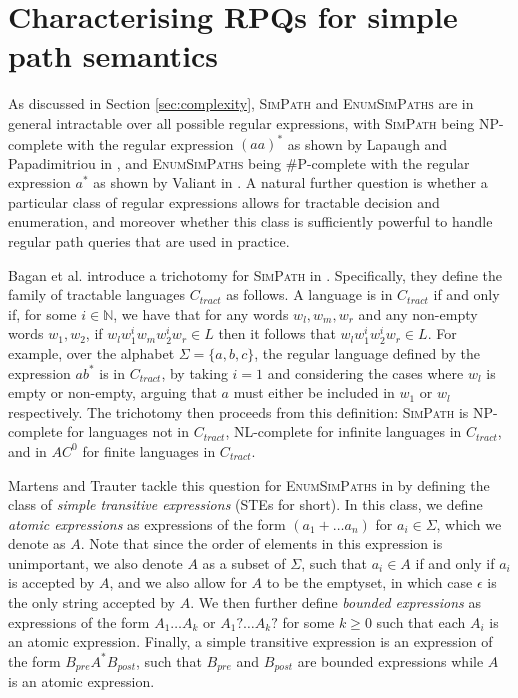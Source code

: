 \documentclass{article}
\begin{document}
\section{Characterising RPQs for simple path semantics}
\label{sec:simple_characterisation}

As discussed in Section \ref{sec:complexity}, \textsc{SimPath} and \textsc{EnumSimPaths} are in general intractable over all possible regular expressions, with \textsc{SimPath} being NP-complete with the regular expression $(aa)^*$ as shown by Lapaugh and Papadimitriou in \cite{lapaughEvenpathProblemGraphs1984}, and \textsc{EnumSimPaths} being \#P-complete with the regular expression $a^*$ as shown by Valiant in \cite{valiantComplexityComputingPermanent1979}. A natural further question is whether a particular class of regular expressions allows for tractable decision and enumeration, and moreover whether this class is sufficiently powerful to handle regular path queries that are used in practice.

Bagan et al. introduce a trichotomy for \textsc{SimPath} in \cite{baganTrichotomyRegularSimple2020}. Specifically, they define the family of tractable languages $C_{tract}$ as follows. A language is in $C_{tract}$ if and only if, for some $i \in \mathbb{N}$, we have that for any words $w_l, w_m, w_r$ and any non-empty words $w_1, w_2$, if $w_l w_1^i w_m w_2^i w_r \in L$ then it follows that $w_l w_1^i w_2^i w_r \in L$. For example, over the alphabet $\Sigma = \{a, b, c\}$, the regular language defined by the expression $ab^*$ is in $C_{tract}$, by taking $i=1$ and considering the cases where $w_l$ is empty or non-empty, arguing that $a$ must either be included in $w_1$ or $w_l$ respectively. The trichotomy then proceeds from this definition: \textsc{SimPath} is NP-complete for languages not in $C_{tract}$, NL-complete for infinite languages in $C_{tract}$, and in $AC^0$ for finite languages in $C_{tract}$.

Martens and Trauter tackle this question for \textsc{EnumSimPaths} in \cite{martensEvaluationEnumerationProblems2018} by defining the class of \emph{simple transitive expressions} (STEs for short). In this class, we define \emph{atomic expressions} as expressions of the form $(a_1 + \dots a_n)$ for $a_i \in \Sigma$, which we denote as $A$. Note that since the order of elements in this expression is unimportant, we also denote $A$ as a subset of $\Sigma$, such that $a_i \in A$ if and only if $a_i$ is accepted by $A$, and we also allow for $A$ to be the emptyset, in which case $\epsilon$ is the only string accepted by $A$. We then further define \emph{bounded expressions} as expressions of the form $A_1 \dots A_k$ or $A_1 ? \dots A_k ?$ for some $k \geq 0$ such that each $A_i$ is an atomic expression. Finally, a simple transitive expression is an expression of the form $B_{pre}A^* B_{post}$, such that $B_{pre}$ and $B_{post}$ are bounded expressions while $A$ is an atomic expression.
\end{document}
